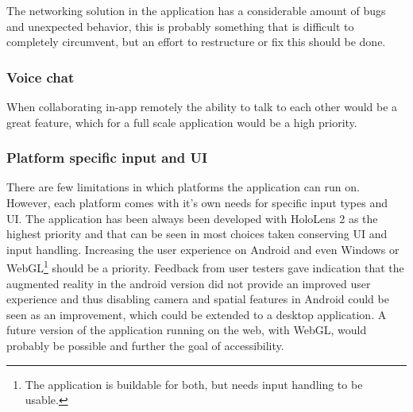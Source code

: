 The networking solution in the application has a considerable amount of bugs and unexpected behavior, this is probably something that is difficult to completely circumvent, but an effort to restructure or fix this should be done.


\subsubsection*{Voice chat}

When collaborating in-app remotely the ability to talk to each other would be a great feature, which for a full scale application would be a high priority. 

\subsubsection*{Platform specific input and UI}
There are few limitations in which platforms the application can run on. However, each platform comes with it's own needs for specific input types and UI. The application has been always been developed with HoloLens 2 as the highest priority and that can be seen in most choices taken conserving UI and input handling. Increasing the user experience on Android and even Windows or WebGL\footnote{The application is buildable for both, but needs input handling to be usable.} should be a priority. Feedback from user testers gave indication that the augmented reality in the android version did not provide an improved user experience and thus disabling camera and spatial features in Android could be seen as an improvement, which could be extended to a desktop application.
A future version of the application running on the web, with WebGL, would probably be possible and further the goal of accessibility.










